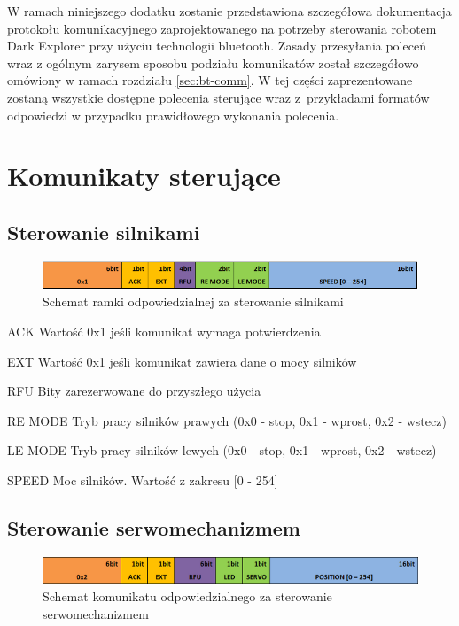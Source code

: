 W ramach niniejszego dodatku zostanie przedstawiona szczegółowa dokumentacja
protokołu komunikacyjnego zaprojektowanego na potrzeby sterowania robotem Dark
Explorer przy użyciu technologii bluetooth. Zasady przesyłania
poleceń wraz z ogólnym zarysem sposobu podziału komunikatów został szczegółowo
omówiony w ramach rozdziału \ref{sec:bt-comm}. W tej części zaprezentowane
zostaną wszystkie dostępne polecenia sterujące wraz z~przykładami
formatów odpowiedzi w przypadku prawidłowego wykonania polecenia.

\section{Komunikaty sterujące}
\subsection{Sterowanie silnikami}
\begin{figure}[h!]
 \centering
 \includegraphics[width=\textwidth]{../images/appendix/cmd_0x01.png}
 \caption{Schemat ramki odpowiedzialnej za sterowanie silnikami} 
 \label{fig:CMD_0x01}
\end{figure}

\begin{basedescript}{\desclabelstyle{\pushlabel}\desclabelwidth{25mm}}
\setlength{\parsep}{0pt}
\setlength{\itemsep}{0mm}
\setlength{\parskip}{0pt}
\item[ACK]
	Wartość 0x1 jeśli komunikat wymaga potwierdzenia
\item[EXT] 
	Wartość 0x1 jeśli komunikat zawiera dane o mocy silników
\item[RFU] 
	Bity zarezerwowane do przyszłego użycia
\item[RE MODE] 
	Tryb pracy silników prawych (0x0 - stop, 0x1 - wprost, 0x2 - wstecz)
\item[LE MODE] 
	Tryb pracy silników lewych (0x0 - stop, 0x1 - wprost, 0x2 - wstecz)
\item[SPEED] 
	Moc silników. Wartość z zakresu [0 - 254]
\end{basedescript}

\subsection{Sterowanie serwomechanizmem}
\begin{figure}[h!] 
 \centering
 \includegraphics[width=\textwidth]{../images/appendix/cmd_0x02.png}
 \caption{Schemat komunikatu odpowiedzialnego za sterowanie serwomechanizmem}
 \label{fig:CMD_0x02}
\end{figure}

